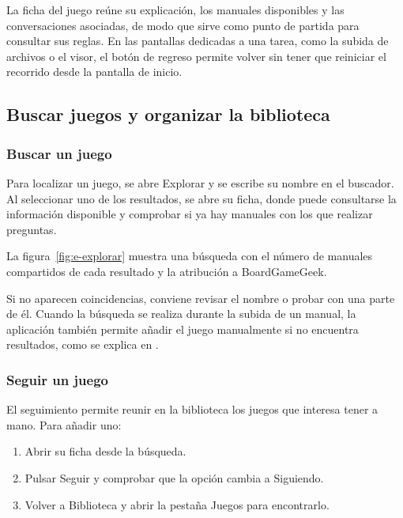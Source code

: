 
La ficha del juego reúne su explicación, los manuales disponibles y las
conversaciones asociadas, de modo que sirve como punto de partida para
consultar sus reglas. En las pantallas dedicadas a una tarea, como la subida
de archivos o el visor, el botón de regreso permite volver sin tener que
reiniciar el recorrido desde la pantalla de inicio.

\subsection{Buscar juegos y organizar la biblioteca}
\label{sec:e-juegos}

\subsubsection{Buscar un juego}

Para localizar un juego, se abre \guillemotleft{}Explorar\guillemotright{} y
se escribe su nombre en el buscador. Al seleccionar uno de los resultados,
se abre su ficha, donde puede consultarse la información disponible y
comprobar si ya hay manuales con los que realizar preguntas.

La figura~\ref{fig:e-explorar} muestra una búsqueda con el número de
manuales compartidos de cada resultado y la atribución a BoardGameGeek.


Si no aparecen coincidencias, conviene revisar el nombre o probar con una
parte de él. Cuando la búsqueda se realiza durante la subida de un manual,
la aplicación también permite añadir el juego manualmente si no encuentra
resultados, como se explica en
\guillemotleft{}\guillemotright{}.

\subsubsection{Seguir un juego}

El seguimiento permite reunir en la biblioteca los juegos que interesa
tener a mano. Para añadir uno:

\begin{enumerate}
    \item Abrir su ficha desde la búsqueda.
    \item Pulsar \guillemotleft{}Seguir\guillemotright{} y comprobar que la
    opción cambia a \guillemotleft{}Siguiendo\guillemotright{}.
    \item Volver a \guillemotleft{}Biblioteca\guillemotright{} y abrir la
    pestaña \guillemotleft{}Juegos\guillemotright{} para encontrarlo.
\end{enumerate}

